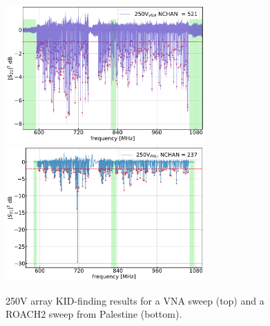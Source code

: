 \begin{figure}[!p]
\centering
\caption[~250V array KID-finding results.]{250V array KID-finding results for a VNA sweep (top) and a ROACH2 sweep from Palestine (bottom).}
\includegraphics[width=0.68\textwidth]{figures/blast_data/sweeps/250V_May2018VNA_FK}
\includegraphics[width=0.68\textwidth]{figures/blast_data/sweeps/250V_PAL_FK}
\label{fig:250V FK}
\end{figure}

